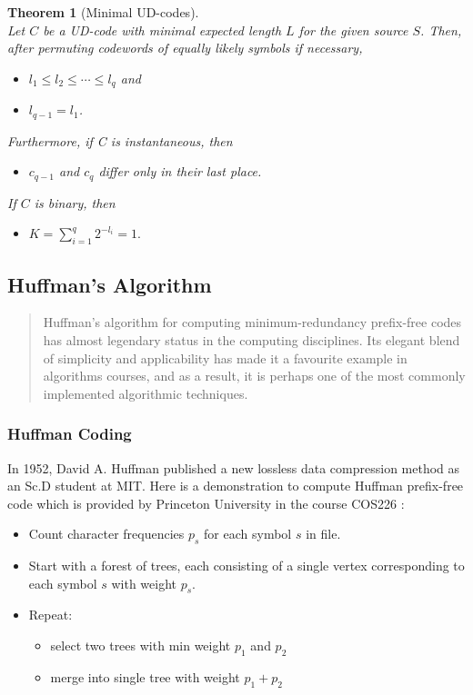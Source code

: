 \documentclass{article}
\newtheorem{theorem}{Theorem}[section]
\begin{document}
\begin{theorem}[Minimal UD-codes]
    \mbox{}\\
    Let $C$ be a UD-code with minimal expected length $L$ for the given source $S$. Then, after permuting codewords of equally likely symbols if necessary,
    \begin{itemize}
        \item $l_{1} \leq l_{2} \leq \cdots \leq l_{q}$ and
        \item $l_{q-1}=l_{1}$.
    \end{itemize}
    Furthermore, if C is instantaneous, then
    \begin{itemize}
        \item $c_{q-1}$ and $c_{q}$ differ only in their last place.
    \end{itemize}
    If $C$ is binary, then
    \begin{itemize}
        \item $K=\sum_{i=1}^{q}2^{-l_{i}}=1.$
    \end{itemize}
\end{theorem}

\subsection{Huffman's Algorithm}

\begin{quotation}
    Huffman’s algorithm for computing minimum-redundancy prefix-free codes has almost legendary status in the computing disciplines. Its elegant blend of simplicity and applicability has made it a favourite example in algorithms courses, and as a result, it is perhaps one of the most commonly implemented algorithmic techniques. \cite{Moffat_2019}
\end{quotation}

\subsubsection{Huffman Coding}

In 1952, David A. Huffman \cite{Huffman_1952} published a new lossless data compression method as an Sc.D student at MIT. Here is a demonstration to compute Huffman prefix-free code which is provided by Princeton University in the course COS226 \cite{princetonLec5.5}:

\begin{itemize}
    \item Count character frequencies $p_{s}$ for each symbol $s$ in file.
    \item Start with a forest of trees, each consisting of a single vertex corresponding to each symbol $s$ with weight $p_{s}$.
    \item Repeat:
        \begin{itemize}
            \item select two trees with min weight $p_{1}$ and $p_{2}$
            \item merge into single tree with weight $p_{1}+p_{2}$
        \end{itemize}
\end{itemize}
\end{document}
